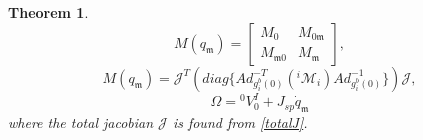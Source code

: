 \documentclass[lettersize,journal]{IEEEtran}
\newtheorem{theorem}{Theorem}
\begin{document}
\begin{theorem}
\begin{equation}
  M(q_\mathfrak{m})=\begin{bmatrix} M_0 & M_{0\mathfrak{m}} \\ M_{\mathfrak{m}0} & M_\mathfrak{m} \end{bmatrix},    
\end{equation}
\begin{equation}
    M(q_\mathfrak{m})=\mathcal{J}^T(diag\{Ad_{g^b_i(0)}^{-T}({}^i\mathcal{M}_i)Ad_{g^b_i(0)}^{-1}\})\mathcal{J},%
    \label{totalM}
\end{equation}
\begin{equation}
    \Omega={}^0V_0^I+J_{sp}\dot{q}_\mathfrak{m}
\end{equation}
where the total jacobian $\mathcal{J}$ is found from \eqref{totalJ}.%


\end{theorem}

\end{document}
